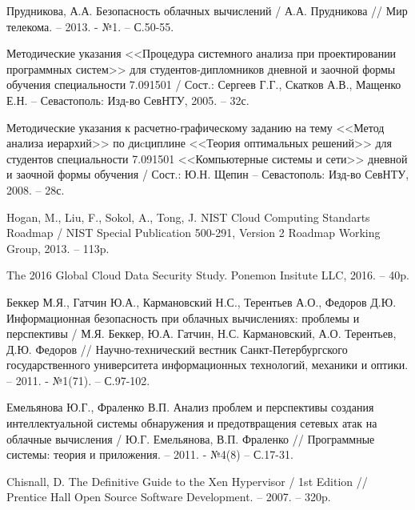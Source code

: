 \begingroup 
\renewcommand{\section}[2]{\anonsection{Библиографический список}}
\begin{thebibliography}{00}

    Прудникова, А.А.
    Безопасность облачных вычислений /
    А.А. Прудникова //
    Мир телекома. -- 2013. - №1.
    -- С.50-55.

    Методические указания <<Процедура системного анализа при проектировании программных систем>>
    для студентов-дипломников дневной и заочной формы обучения специальности 7.091501 /
    Сост.: Сергеев Г.Г., Скатков А.В., Мащенко Е.Н. -- Севастополь:
    Изд-во СевНТУ, 2005. -- 32с.

    Методические указания к расчетно-графическому заданию
    на тему <<Метод анализа иерархий>>  по диcциплине <<Теория оптимальных решений>>
    для студентов специальности 7.091501 <<Компьютерные системы и сети>>
    дневной и заочной формы обучения /
    Сост.: Ю.Н. Щепин -- Севастополь:
    Изд-во СевНТУ, 2008. -- 28с.

    Hogan, M., Liu, F., Sokol, A., Tong, J.
    NIST Cloud Computing Standarts Roadmap /
    NIST Special Publication 500-291, Version 2
    Roadmap Working Group, 2013. -- 113p.

    The 2016 Global Cloud Data Security Study.
    Ponemon Insitute LLC, 2016. -- 40p.

    Беккер М.Я., Гатчин Ю.А., Кармановский Н.С., Терентьев А.О., Федоров Д.Ю.
    Информационная безопасность при облачных вычислениях: проблемы и перспективы /
    М.Я. Беккер, Ю.А. Гатчин, Н.С. Кармановский, А.О. Терентьев, Д.Ю. Федоров //
    Научно-технический вестник Санкт-Петербургского государственного университета информационных технологий, механики и оптики. -- 2011. - №1(71).
    -- С.97-102.

    Емельянова Ю.Г., Фраленко В.П.
    Анализ проблем и перспективы создания интеллектуальной системы обнаружения и предотвращения сетевых атак на облачные вычисления /
    Ю.Г. Емельянова, В.П. Фраленко //
    Программные системы: теория и приложения. -- 2011. - №4(8)
    -- С.17-31.

    Chisnall, D.
    The Definitive Guide to the Xen Hypervisor /
    1st Edition //
    Prentice Hall Open Source Software Development. -- 2007. -- 320p.


\end{thebibliography}
